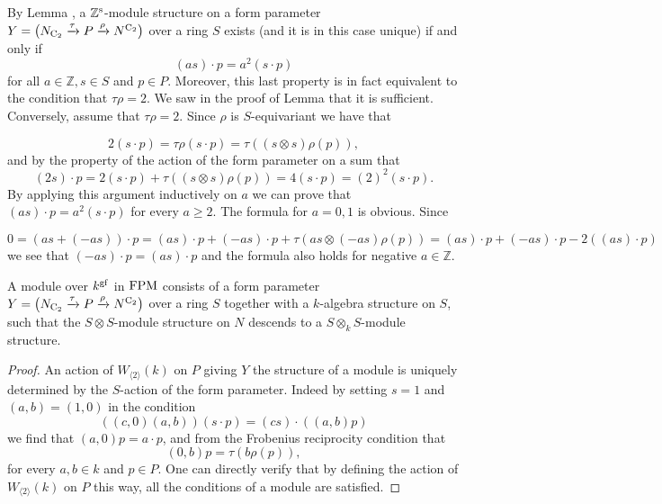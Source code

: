 \begin{remark}
\label{remark:criterion-genuine-symmetric}%
By Lemma , a $\mathbb{Z}^{\mathrm{s}}$-module structure on a form parameter $
Y=\big(N_{\mathrm{C_2}}\xrightarrow{\tau}P\xrightarrow{\rho}N^{\mathrm{C_2}}\big)
$
over a ring $S$ exists (and it is in this case unique) if and only if
\[
(as)\cdot p=a^2(s\cdot p)
\]
for all $a\in\mathbb{Z}, s\in S$ and $p\in P$. Moreover, this last property is in fact equivalent to the condition that $\tau\rho=2$. We saw in the proof of Lemma  that it is sufficient. Conversely, assume that $\tau\rho=2$. Since $\rho$ is $S$-equivariant we have that
 
\[
2(s\cdot p)=\tau\rho(s\cdot p)=\tau((s\otimes s) \rho (p)),
\]
 and by the property of the action of the form parameter on a sum that
\[
(2s)\cdot p=2(s\cdot p)+\tau((s\otimes s) \rho (p))=4(s\cdot p)=(2)^2(s\cdot p).
\]
By applying this argument inductively on $a$ we can prove that $(as)\cdot p=a^2(s\cdot p)$ for every $a\geq 2$. The formula for $a=0,1$ is obvious. Since
 
\[
0=(as+(-as))\cdot p=(as)\cdot p+(-as)\cdot p+\tau(as\otimes (-as)\rho(p))=(as)\cdot p+(-as)\cdot p-2((as)\cdot p)
\]
 we see that $(-as)\cdot p=(as)\cdot p$ and the formula also holds for negative $a\in\mathbb{Z}$.
\end{remark}

 
 
\begin{lemma}
A module over $k^{\mathrm{g}\mathrm{f}}$ in $\mathrm {FPM}$ consists of a form parameter
$
Y=\big(N_{\mathrm{C_2}}\xrightarrow{\tau}P\xrightarrow{\rho}N^{\mathrm{C_2}}\big)
$
over a ring $S$ together with a $k$-algebra structure on $S$, such that the $S\otimes S$-module structure on $N$ descends to a $S\otimes_k S$-module structure.
\end{lemma}
 
 
 \begin{proof}
 An action of $W_{\langle 2\rangle}(k)$ on $P$ giving $Y$ the structure of a module is  uniquely determined by the $S$-action of the form parameter. Indeed by setting $s=1$ and $(a,b)=(1,0)$ in the condition
\[
((c,0)(a,b))(s\cdot p)=(cs)\cdot ((a,b)p)
\]
we find that $(a,0)p=a\cdot p$, and from the Frobenius reciprocity condition that
\[
(0,b)p=\tau(b\rho(p)),
\]
for every $a,b\in k$ and $p\in P$. One can directly verify that by defining the action of $W_{\langle 2\rangle}(k)$ on $P$ this way, all the conditions of a module are satisfied.
 \end{proof}
 
